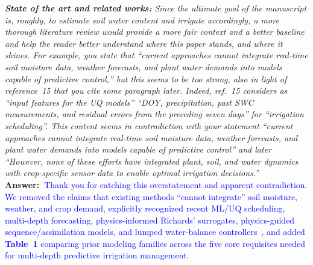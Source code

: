 \documentclass[10pt]{article}
\newcommand{\query}[2][]{\ifthenelse{\equal{#1}{}}{}{\textbf{#1:}~}\emph{#2}}
\newcommand{\ans}[1]{\textbf{Answer:~}#1}
\begin{document}
\query[R-1.1]{\textbf{State of the art and related works:} Since the ultimate goal of the manuscript is, roughly, to estimate soil water content and irrigate accordingly, a more thorough literature review would provide a more fair context and a better baseline and help the reader better understand where this paper stands, and where it shines. For example, you state that ``current approaches cannot integrate real-time soil moisture data, weather forecasts, and plant water demands into models capable of predictive control,'' but this seems to be too strong, also in light of reference~15 that you cite some paragraph later. Indeed, ref.~15 considers as ``input features for the UQ models'' ``DOY, precipitation, past SWC measurements, and residual errors from the preceding seven days'' for ``irrigation scheduling''. This content seems in contradiction with your statement ``current approaches cannot integrate real-time soil moisture data, weather forecasts, and plant water demands into models capable of predictive control'' and later ``However, none of these efforts have integrated plant, soil, and water dynamics with crop-specific sensor data to enable optimal irrigation decisions.''}\\
\ans{\textcolor{blue}{Thank you for catching this overstatement and apparent contradiction. We removed the claims that existing methods ``cannot integrate'' soil moisture, weather, and crop demand, explicitly recognized recent ML/UQ scheduling, multi-depth forecasting, physics-informed Richards' surrogates, physics-guided sequence/assimilation models, and lumped water-balance controllers~\cite{Zou2010, Murcia2024, Bagheri2025, condeforecast2024, Bandai2022, Lan2024, Elkha2024, Bandai2024, Ye2025, WangY2023, ZhangT2025, Jiang2025, Jiang2026}, and added \textbf{Table~1} comparing prior modeling families across the five core requisites needed for multi-depth predictive irrigation management.}}\\
\end{document}
